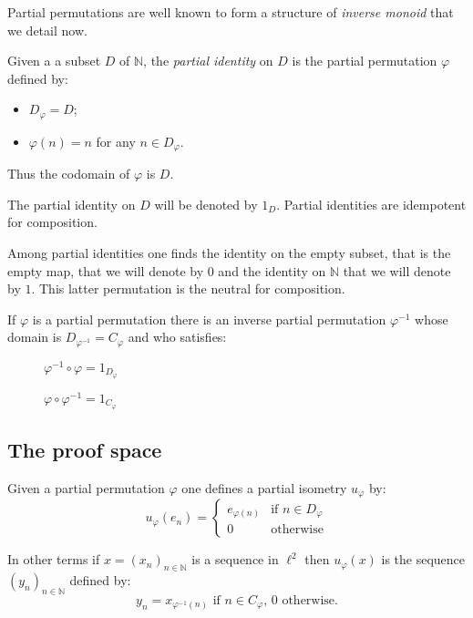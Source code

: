 Partial permutations are well known to form a structure of \emph{inverse
monoid} that we detail now.

Given a a subset \(D\) of \(\mathbb{N}\), the \emph{partial identity} on
\(D\) is the partial permutation \(\varphi\) defined by:
\begin{itemize}
\item \(D_\varphi = D\);
\item \(\varphi(n) = n\) for any \(n\in D_\varphi\).
\end{itemize}

Thus the codomain of \(\varphi\) is \(D\).

The partial identity on \(D\) will be denoted by \(1_D\). Partial
identities are idempotent for composition.

Among partial identities one finds the identity on the empty subset,
that is the empty map, that we will denote by \(0\) and the identity on
\(\mathbb{N}\) that we will denote by \(1\). This latter permutation is
the neutral for composition.

If \(\varphi\) is a partial permutation there is an inverse partial
permutation \(\varphi^{-1}\) whose domain is
\(D_{\varphi^{-1}} = C_{\varphi}\) and who satisfies:

\begin{description}
\item[]
\(\varphi^{-1}\circ\varphi = 1_{D_\varphi}\)

\(\varphi\circ\varphi^{-1} = 1_{C_\varphi}\)
\end{description}


\subsection{The proof space}\label{the-proof-space}

Given a partial permutation \(\varphi\) one defines a partial isometry
\(u_\varphi\) by:
\begin{equation*}
u_\varphi(e_n) =
\begin{cases}
e_{\varphi(n)} & \text{if $n\in D_\varphi$} \\
0 & \text{otherwise}
\end{cases}
\end{equation*}

In other terms if \(x=(x_n)_{n\in\mathbb{N}}\) is a sequence in
\(\ell^2\) then \(u_\varphi(x)\) is the sequence
\((y_n)_{n\in\mathbb{N}}\) defined by:
\begin{equation*}
y_n = x_{\varphi^{-1}(n)} \text{ if $n\in C_\varphi$, $0$ otherwise.}
\end{equation*}

